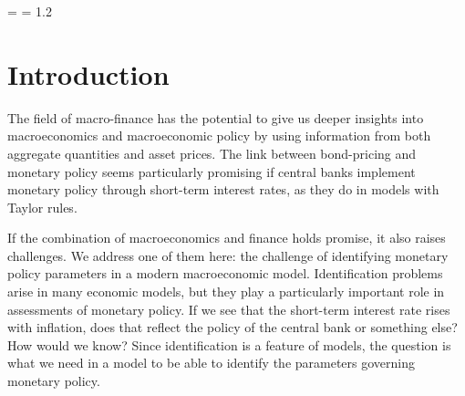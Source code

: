 \documentclass[11pt]{article}
\renewcommand{\thefootnote}{\fnsymbol{footnote}}
\begin{document}
\vfill
{

\medskip
{}

\newpage
\parskip=\bigskipamount
\setcounter{footnote}{0}
\renewcommand{\thefootnote}{\arabic{footnote}}
\setcounter{page}{1} \thispagestyle{empty}
\newlength{\oldbaselineskip}
\setlength{\oldbaselineskip}{\baselineskip}
\baselineskip = 1.2\baselineskip

\section{Introduction}

The field of macro-finance has the potential to give us deeper insights
into macroeconomics and macroeconomic policy by using information
from both aggregate quantities and asset prices.
The link between bond-pricing and monetary policy seems particularly promising
if central banks implement monetary policy through short-term interest rates,
as they do in models with Taylor rules.

If the combination of macroeconomics and finance holds promise, it also raises challenges.
We address one of them here: the challenge of identifying monetary policy
parameters in a modern macroeconomic model.
Identification problems arise in many economic models,
but they play a particularly important role in assessments
of monetary policy.
If we see that the short-term interest rate rises with inflation,
does that reflect the policy of the central bank or something else?
How would we know?
Since identification is a feature of models,
the question is what we need in a model to be able to identify the
parameters governing monetary policy.

}
\end{document}
